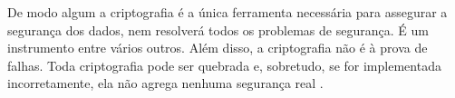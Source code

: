 De modo algum a criptografia é a única ferramenta necessária para assegurar a segurança dos dados, nem resolverá todos os problemas de segurança. É um instrumento entre vários outros. Além disso, a criptografia não é à prova de falhas. Toda criptografia pode ser quebrada e, sobretudo, se for implementada incorretamente, ela não agrega nenhuma segurança real \cite{burnett:02}.

